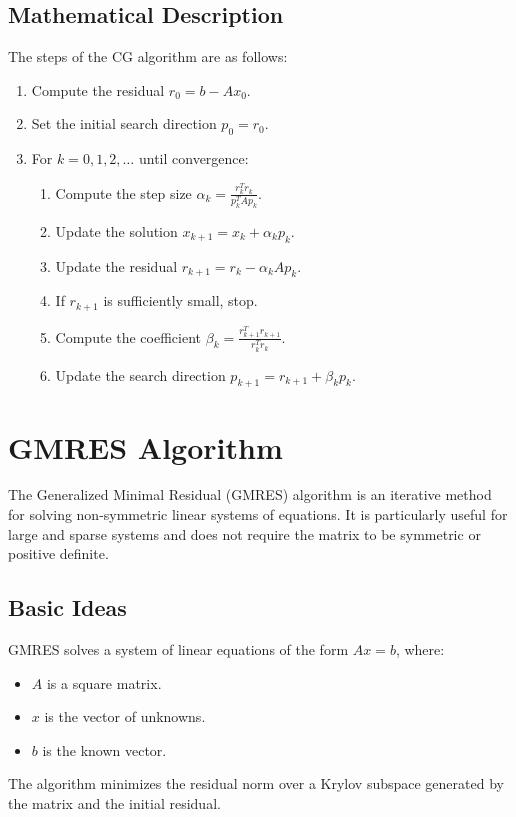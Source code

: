 \documentclass{article}
\begin{document}
\subsection{Mathematical Description}
The steps of the CG algorithm are as follows:
\begin{enumerate}
    \item Compute the residual $r_0 = b - Ax_0$.
    \item Set the initial search direction $p_0 = r_0$.
    \item For $k = 0, 1, 2, \ldots$ until convergence:
    \begin{enumerate}
        \item Compute the step size $\alpha_k = \frac{r_k^T r_k}{p_k^T A p_k}$.
        \item Update the solution $x_{k+1} = x_k + \alpha_k p_k$.
        \item Update the residual $r_{k+1} = r_k - \alpha_k A p_k$.
        \item If $r_{k+1}$ is sufficiently small, stop.
        \item Compute the coefficient $\beta_k = \frac{r_{k+1}^T r_{k+1}}{r_k^T r_k}$.
        \item Update the search direction $p_{k+1} = r_{k+1} + \beta_k p_k$.
    \end{enumerate}
\end{enumerate}

\section{GMRES Algorithm}
The Generalized Minimal Residual (GMRES) algorithm is an iterative method for solving non-symmetric linear systems of equations. It is particularly useful for large and sparse systems and does not require the matrix to be symmetric or positive definite.

\subsection{Basic Ideas}
GMRES solves a system of linear equations of the form $Ax = b$, where:
\begin{itemize}
    \item $A$ is a square matrix.
    \item $x$ is the vector of unknowns.
    \item $b$ is the known vector.
\end{itemize}
The algorithm minimizes the residual norm over a Krylov subspace generated by the matrix and the initial residual.
\end{document}
